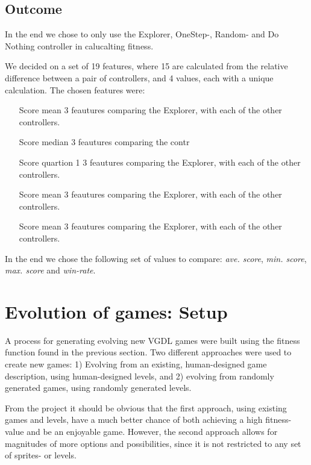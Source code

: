 \documentclass[a4paper,titlepage,final]{report}
\begin{document}
\subsection{Outcome}

In the end we chose to only use the Explorer, OneStep-, Random- and Do Nothing controller in calucalting fitness.

We decided on a set of 19 features, where 15 are calculated from the relative difference between a pair of controllers, and 4 values, each with a unique calculation.
The chosen features were:

\begin{itemize}
\item[Score mean] 3 feautures comparing the Explorer, with each of the other controllers.
\item[Score median] 3 feautures comparing the contr
\item[Score quartion 1] 3 feautures comparing the Explorer, with each of the other controllers.
\item[Score mean] 3 feautures comparing the Explorer, with each of the other controllers.
\item[Score mean] 3 feautures comparing the Explorer, with each of the other controllers.

\end{itemize}

In the end we chose the following set of values to compare: \textit{ave. score},  \textit{min. score}, \textit{max. score} and \textit{win-rate}.




\section{Evolution of games: Setup}
\label{sec_task2evolvingGames}
A process for generating evolving new VGDL games were built using the fitness function found in the previous section.
Two different approaches were used to create new games:
1) Evolving from an existing, human-designed game description, using human-designed levels, and 2) evolving from randomly generated games, using randomly generated levels.

From the project it should be obvious that the first approach, using existing games and levels, have a much better chance of both achieving a high fitness-value and be an enjoyable game.
However, the second approach allows for magnitudes of more options and possibilities, since it is not restricted to any set of sprites- or levels.
\end{document}
